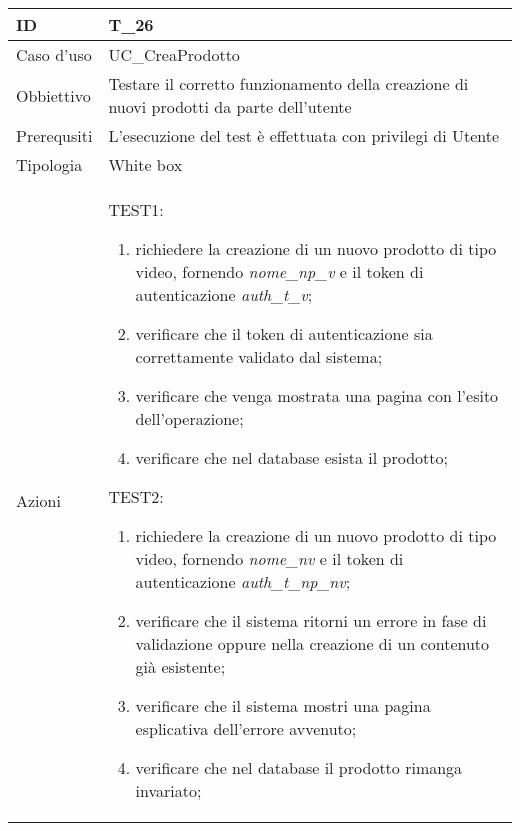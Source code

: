 \begin{table}[hb]
    \centering
    \begin{tabular}{ |p{2cm}|p{10cm}|  }
        \hline
        ID          & T\_26                                                                                    \\\hline
        Caso d'uso  & UC\_CreaProdotto                                                                         \\\hline
        Obbiettivo  & Testare il corretto funzionamento della creazione di nuovi prodotti da parte dell'utente \\\hline
        Prerequsiti & L'esecuzione del test è effettuata con privilegi di Utente                               \\\hline
        Tipologia   & White box                                                                                \\\hline
        Azioni      &
        TEST1:
        \begin{enumerate}[nosep, topsep=0pt]
            \item richiedere la creazione di un nuovo prodotto di tipo video, fornendo \emph{nome\_np\_v} e il token di autenticazione \emph{auth\_t\_v};
            \item verificare che il token di autenticazione sia correttamente validato dal sistema;
            \item verificare che venga mostrata una pagina con l'esito dell'operazione;
            \item verificare che nel database esista il prodotto;
        \end{enumerate}
        \vspace{0.5cm} TEST2:
        \begin{enumerate}[nosep, topsep=0pt]
            \item richiedere la creazione di un nuovo prodotto di tipo video, fornendo \emph{nome\_nv} e il token di autenticazione \emph{auth\_t\_np\_nv};
            \item verificare che il sistema ritorni un errore in fase di validazione oppure nella creazione di un contenuto già esistente;
            \item verificare che il sistema mostri una pagina esplicativa dell'errore avvenuto;
            \item verificare che nel database il prodotto rimanga invariato;
        \end{enumerate}
        \vspace{0.5cm}

\end{tabular}
\end{table}

